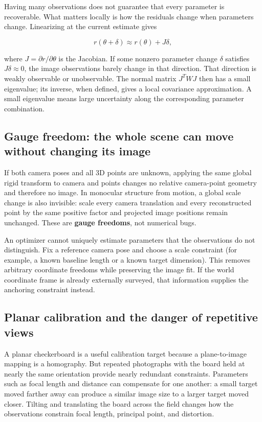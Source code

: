 Having many observations does not guarantee that every parameter is recoverable. What matters locally is how the residuals change when parameters change. Linearizing at the current estimate gives

\[
r(\theta+\delta)\approx r(\theta)+J\delta,
\]

where \(J=\partial r/\partial\theta\) is the Jacobian. If some nonzero parameter change \(\delta\) satisfies \(J\delta\approx0\), the image observations barely change in that direction. That direction is weakly observable or unobservable. The normal matrix \(J^T W J\) then has a small eigenvalue; its inverse, when defined, gives a local covariance approximation. A small eigenvalue means large uncertainty along the corresponding parameter combination.

\subsection{Gauge freedom: the whole scene can move without changing its image}\label{02-foundations-ii-ch036-gauge-freedom-the-whole-scene-can-move-without-changing-its-image}

If both camera poses and all 3D points are unknown, applying the same global rigid transform to camera and points changes no relative camera-point geometry and therefore no image. In monocular structure from motion, a global scale change is also invisible: scale every camera translation and every reconstructed point by the same positive factor and projected image positions remain unchanged. These are \textbf{gauge freedoms}, not numerical bugs.

An optimizer cannot uniquely estimate parameters that the observations do not distinguish. Fix a reference camera pose and choose a scale constraint (for example, a known baseline length or a known target dimension). This removes arbitrary coordinate freedoms while preserving the image fit. If the world coordinate frame is already externally surveyed, that information supplies the anchoring constraint instead.

\subsection{Planar calibration and the danger of repetitive views}\label{02-foundations-ii-ch036-planar-calibration-and-the-danger-of-repetitive-views}

A planar checkerboard is a useful calibration target because a plane-to-image mapping is a homography. But repeated photographs with the board held at nearly the same orientation provide nearly redundant constraints. Parameters such as focal length and distance can compensate for one another: a small target moved farther away can produce a similar image size to a larger target moved closer. Tilting and translating the board across the field changes how the observations constrain focal length, principal point, and distortion.

